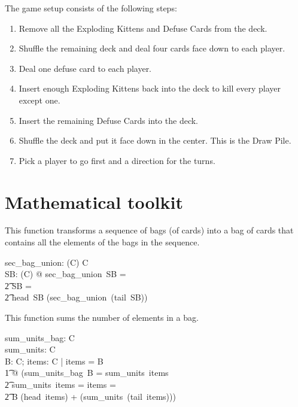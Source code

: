 \documentclass[11pt, fuzz]{article}
\begin{document}
The game setup consists of the following steps:

\begin{enumerate}
    \item Remove all the Exploding Kittens and Defuse Cards from the deck. 
    \item Shuffle the remaining deck and deal four cards face down to each player.
    \item Deal one defuse card to each player. 
    \item Insert enough Exploding Kittens back into the deck to kill every player except one. 
    \item Insert the remaining Defuse Cards into the deck. 
    \item Shuffle the deck and put it face down in the center. This is the Draw Pile. 
    \item Pick a player to go first and a direction for the turns. 
\end{enumerate}


\section{Mathematical toolkit}

This function transforms a sequence of bags (of cards) into a bag of cards that contains all the elements of the bags in the sequence. 

\begin{gendef}[C]
    sec\_bag\_union: \seq (\bag C) \fun \bag C\\
\where
    \forall SB: \seq (\bag C) @ sec\_bag\_union~SB = \\
\t2    \IF SB = \emptyset \THEN \lbag~\rbag\\
\t2    \ELSE head~SB \uplus (sec\_bag\_union~(tail~SB))
\end{gendef}

This function sums the number of elements in a bag. 

\begin{gendef}[C]
    sum\_units\_bag: \bag C \fun \nat\\
    sum\_units: \seq C \fun \nat\\
\where
    \forall B: \bag C; items: \seq C | \ran items = \dom B\\
    \t1 @ (sum\_units\_bag~B = sum\_units~items \land\\
    \t2 sum\_units~items = \IF items = \emptyset {}\\
    \t2 \ELSE B \bcount (head~items) + (sum\_units~(tail~items)))
\end{gendef}
\end{document}

